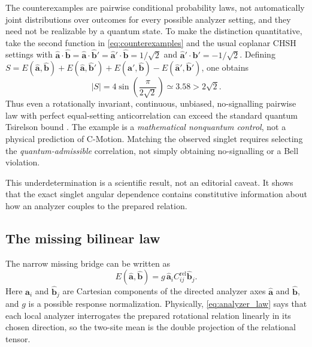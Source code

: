 \documentclass[11pt]{article}
\theoremstyle{remark}
\newcommand{\cmotion}{\mbox{C-Motion}}
\newcommand{\ahat}{\hat{\bm a}}
\newcommand{\bhat}{\hat{\bm b}}
\newcommand{\Crel}{C^{\mathrm{rel}}}
\begin{document}
The counterexamples are pairwise conditional probability laws, not automatically
joint distributions over outcomes for every possible analyzer setting, and they
need not be realizable by a quantum state.  To make the distinction quantitative,
take the second function in \eqref{eq:counterexamples} and the usual coplanar
CHSH settings with
\(\ahat\cdot\bhat=\ahat\cdot\bhat'=\ahat'\cdot\bhat=1/\sqrt2\)
and \(\ahat'\cdot\bhat'=-1/\sqrt2\).  Defining
\(S=E(\ahat,\bhat)+E(\ahat,\bhat')+E(\ahat',\bhat)-E(\ahat',\bhat')\),
one obtains
\begin{equation}
  |S|=4\sin\!\left(\frac{\pi}{2\sqrt2}\right)
  \simeq3.58>2\sqrt2.
  \label{eq:nonquantum_nosignal_chsh}
\end{equation}
Thus even a rotationally invariant, continuous, unbiased, no-signalling
pairwise law with perfect equal-setting anticorrelation can exceed the
standard quantum Tsirelson bound \cite{Tsirelson1980}.  The example is a \emph{mathematical
nonquantum control}, not a physical prediction of \cmotion{}.  Matching the
observed singlet requires selecting the \emph{quantum-admissible} correlation,
not simply obtaining no-signalling or a Bell violation.

This underdetermination is a scientific result, not an editorial caveat.  It shows that the exact
singlet angular dependence contains constitutive information about how an analyzer couples to the
prepared relation.

\subsection{The missing bilinear law}

The narrow missing bridge can be written as
\begin{equation}
  \boxed{
  E(\ahat,\bhat)
  =g\,\ahat_i\Crel_{ij}\bhat_j.}
  \label{eq:analyzer_law}
\end{equation}
Here $\ahat_i$ and $\bhat_j$ are Cartesian components of the directed analyzer
axes $\ahat$ and $\bhat$, and $g$ is a possible response normalization.
Physically, \eqref{eq:analyzer_law} says that each local analyzer interrogates the
prepared rotational relation linearly in its chosen direction, so the two-site mean
is the double projection of the relational tensor.
\end{document}

